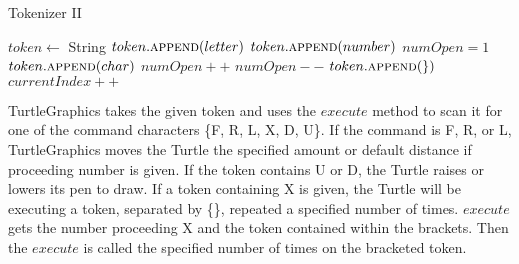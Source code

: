 \documentclass[12pt]{article}
\begin{document}
\begin{algorithm}[H]
\caption{Tokenizer II}
\begin{algorithmic}
        \State $token \gets$ String
                \State $token.\Call{append}{letter}$
                     \State $token.\Call{append}{number}$
                \EndWhile
                \State {}
                \State $numOpen = 1$
                    \State $token.\Call{append}{char}$
                        \State $numOpen++$
                        \State $numOpen--$
                            \State $token.\Call{append}{\}}$
                        \EndIf
                    \EndIf
                \EndWhile
                \State {}
            \Else
                \State $currentIndex++$
            \EndIf
        \EndWhile
        \State {}
    \EndProcedure
\end{algorithmic}
\end{algorithm}

TurtleGraphics takes the given token and uses the $execute$ method to scan it for one of the
command characters \{F, R, L, X, D, U\}. If the command is F, R, or L, TurtleGraphics moves
the Turtle the specified amount or default distance if proceeding number is given. If the
token contains U or D, the Turtle raises or lowers its pen to draw. If a token containing
X is given, the Turtle will be executing a token, separated by \{\}, repeated a specified
number of times. $execute$ gets the number proceeding X and the token contained within the
brackets. Then the $execute$ is called the specified number of times on the bracketed token.
\end{document}
